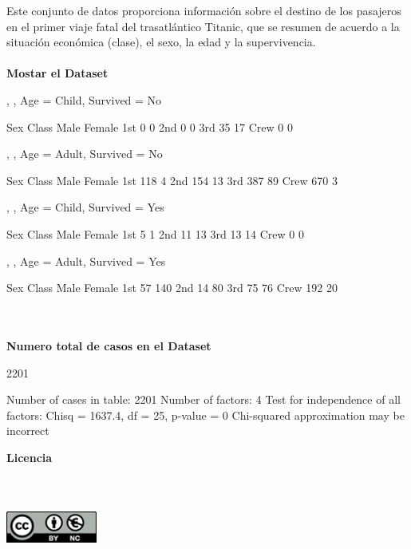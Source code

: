 \documentclass[11pt]{report}
\begin{document}
Este conjunto de datos proporciona información sobre el destino de los pasajeros en el primer viaje fatal del trasatlántico Titanic, que se resumen de acuerdo a la situación económica (clase), el sexo, la edad y la supervivencia.
\\\\
\textbf{Mostar el Dataset}
\begin{Schunk}
\begin{Soutput}
, , Age = Child, Survived = No

      Sex
Class  Male Female
  1st     0      0
  2nd     0      0
  3rd    35     17
  Crew    0      0

, , Age = Adult, Survived = No

      Sex
Class  Male Female
  1st   118      4
  2nd   154     13
  3rd   387     89
  Crew  670      3

, , Age = Child, Survived = Yes

      Sex
Class  Male Female
  1st     5      1
  2nd    11     13
  3rd    13     14
  Crew    0      0

, , Age = Adult, Survived = Yes

      Sex
Class  Male Female
  1st    57    140
  2nd    14     80
  3rd    75     76
  Crew  192     20
\end{Soutput}
\end{Schunk}
\\\\
\textbf{Numero total de casos en el Dataset}
\begin{Schunk}
\begin{Soutput}
[1] 2201
\end{Soutput}
\begin{Soutput}
Number of cases in table: 2201 
Number of factors: 4 
Test for independence of all factors:
	Chisq = 1637.4, df = 25, p-value = 0
	Chi-squared approximation may be incorrect
\end{Soutput}
\end{Schunk}
\clearpage \newpage
\textbf{Licencia}\\\\\\
\includegraphics[width=3cm, height=2cm]{licencia.png}
\end{document}
